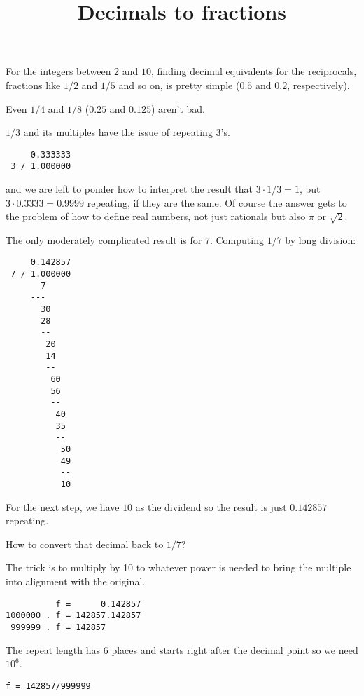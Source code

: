 \documentclass[11pt, oneside]{article}
\title{Decimals to fractions}
\date{}
\begin{document}
\maketitle
\Large


For the integers between $2$ and $10$, finding decimal equivalents for the reciprocals, fractions like $1/2$ and $1/5$ and so on, is pretty simple ($0.5$ and $0.2$, respectively).

Even $1/4$ and $1/8$ ($0.25$ and $0.125$) aren't bad.  

$1/3$ and its multiples have the issue of repeating $3$'s.

\begin{verbatim}
     0.333333
 3 / 1.000000
\end{verbatim}

and we are left to ponder how to interpret the result that $3 \cdot 1/3 = 1$, but $3 \cdot 0.3333 = 0.9999$ repeating, if they are the same.  Of course the answer gets to the problem of how to define real numbers, not just rationals but also $\pi$ or $\sqrt{2}$.

The only moderately complicated result is for $7$.  Computing $1/7$ by long division:

\begin{verbatim}
     0.142857
 7 / 1.000000
       7
     ---
       30
       28
       --
        20
        14
        --
         60
         56
         --
          40
          35
          --
           50
           49
           --
           10
\end{verbatim}

For the next step, we have $10$ as the dividend so the result is just $0.142857$ repeating.

How to convert that decimal back to $1/7$?

The trick is to multiply by 10 to whatever power is needed to bring the multiple into alignment with the original.

\begin{verbatim}
          f =      0.142857
1000000 . f = 142857.142857
 999999 . f = 142857
 \end{verbatim}

 The repeat length has $6$ places and starts right after the decimal point so we need $10^6$.

\begin{verbatim}
f = 142857/999999
\end{verbatim}
\end{document}
